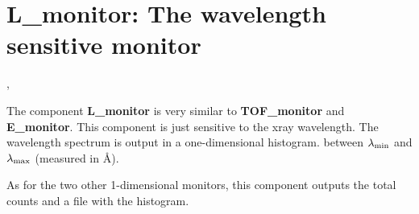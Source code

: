 

\section{L\_monitor: The wavelength sensitive monitor}
\label{s:L_monitor}

,{}


The component {\bf L\_monitor} is very similar to
{\bf TOF\_monitor} and {\bf E\_monitor}.
This component is just sensitive to the xray wavelength.
The wavelength spectrum is output in a one-dimensional histogram.
between $\lambda_{\rm min}$ and $\lambda_{\rm max}$ (measured in \AA ).

As for the two other 1-dimensional monitors, this component outputs
the total counts and a file with the histogram.

